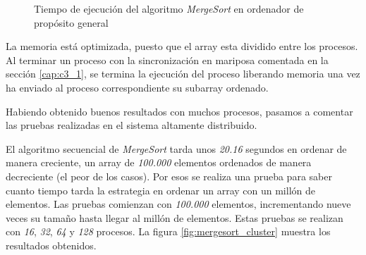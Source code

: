 		\begin{figure}[!h]
		\caption{Tiempo de ejecución del algoritmo \textit{MergeSort} en ordenador de propósito general}
		\label{fig:mergesort_hist}
		\end{figure}
		
			
		
		La memoria está optimizada, puesto que el array esta dividido entre los procesos. Al terminar un proceso con la sincronización en mariposa comentada en la sección \ref{cap:c3_1}, se termina la ejecución del proceso liberando memoria una vez ha enviado al proceso correspondiente su subarray ordenado.
		
		\newpage
		
		
		Habiendo obtenido buenos resultados con muchos procesos, pasamos a comentar las pruebas realizadas en el sistema altamente distribuido.
		
		El algoritmo secuencial de \textit{MergeSort} tarda unos \textit{20.16} segundos en ordenar de manera creciente, un array de \textit{100.000} elementos ordenados de manera decreciente (el peor de los casos). Por esos se realiza una prueba para saber cuanto tiempo tarda la estrategia en ordenar un array con un millón de elementos. Las pruebas comienzan con \textit{100.000} elementos, incrementando nueve veces su tamaño hasta llegar al millón de elementos. Estas pruebas se realizan con \textit{16}, \textit{32}, \textit{64} y \textit{128} procesos. La figura \ref{fig:mergesort_cluster} muestra los resultados obtenidos. 
		
